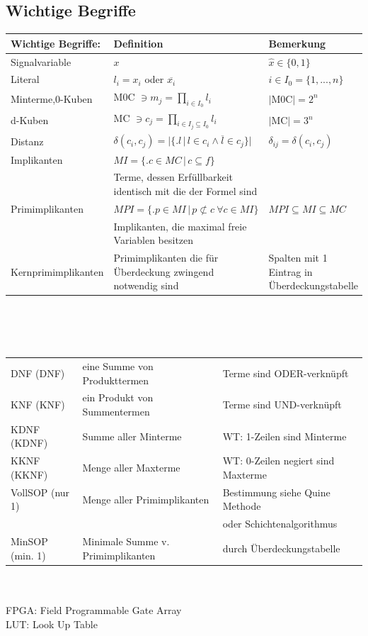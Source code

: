 \documentclass[6pt,a4paper]{scrartcl}
\newcommand{\iset}[2]{\ensuremath{\bigl\{ \bigl. #1 \, \bigr| \, #2 \bigr\}}}		%
\newcommand{\eset}[1]{\ensuremath{\bigl\{#1\bigr\}}}								%
\begin{document}
\begin{multicols*}{3}
	\subsection{Wichtige Begriffe}
	\begin{tabular}{l|p{4cm}|p{2.2 cm}}
		Wichtige Begriffe: & Definition & Bemerkung\\ \hline
		Signalvariable & $x$ & $\hat x \in \eset{0,1}$ \\
		Literal & $l_i = x_i$ oder $\overline{x_i}$ & $i \in I_0=\eset{1,...,n}$\\
		Minterme,0-Kuben & M0C $\ni m_j = \prod\limits_{i\in I_0} l_i$ & $|$M0C$| = 2^n$ \\
		d-Kuben & MC $\ni c_j = \prod\limits_{i\in I_j \subseteq I_0} l_i$ & $|$MC$|=3^n$\\
		Distanz & $\delta(c_i,c_j) = \bigl| \iset{l}{l \in c_i \land \overline{l}\in c_j}  \bigr|$ & $\delta_{ij} = \delta(c_i,c_j)$ \\
		Implikanten & $MI = \iset{c \in MC}{c \subseteq f}$ &  \\
		& Terme, dessen Erfüllbarkeit identisch mit die der Formel sind & \\
		Primimplikanten & $MPI = \iset{p \in MI}{p \not\subset c \ \forall c \in MI}$ & $MPI \subseteq MI \subseteq MC$\\
		& Implikanten, die maximal freie Variablen besitzen & \\
		Kernprimimplikanten & Primimplikanten die für Überdeckung zwingend notwendig sind & Spalten mit 1 Eintrag in Überdeckungstabelle\\
	\end{tabular}\\ \\ \\
	\begin{tabular}{l|l|l}
		DNF (DNF) & eine Summe von Produkttermen & Terme sind ODER-verknüpft \\
		KNF (KNF) & ein Produkt von Summentermen & Terme sind UND-verknüpft\\
		KDNF (KDNF)& Summe aller Minterme & WT: 1-Zeilen sind Minterme\\
		KKNF (KKNF)& Menge aller Maxterme & WT: 0-Zeilen negiert sind Maxterme \\
		VollSOP (nur 1)& Menge aller Primimplikanten & Bestimmung siehe Quine Methode\\
		& & oder Schichtenalgorithmus\\
		MinSOP (min. 1)& Minimale Summe v. Primimplikanten & durch Überdeckungstabelle \\
	\end{tabular}
	\\ \\
	FPGA: Field Programmable Gate Array\\
	LUT: Look Up Table\\

\end{multicols*}
\end{document}

